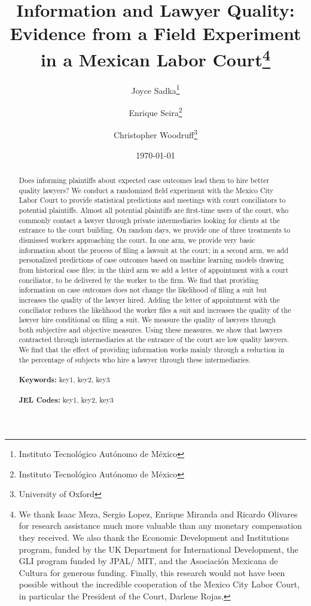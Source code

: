 \documentclass[oneside,12pt]{article}
\begin{document}
\begin{titlepage}
\title{Information and Lawyer Quality: Evidence from a Field Experiment in a Mexican Labor Court\thanks{We thank Isaac Meza, Sergio Lopez, Enrique Miranda and Ricardo Olivares for research assistance much more valuable than any monetary compensation they received. We also thank the Economic Development and Institutions program, funded by the UK Department for International Development, the GLI program funded by JPAL/ MIT, and the Asociación Mexicana de Cultura for generous funding. Finally, this research would not have been possible without the incredible cooperation of the Mexico City Labor Court, in particular the President of the Court, Darlene Rojas.}}
\author{Joyce Sadka\thanks{Instituto Tecnológico Autónomo de México} \and Enrique Seira\thanks{Instituto Tecnológico Autónomo de México} \and Christopher Woodruff\thanks{University of Oxford}}
\date{\today}
\maketitle
\begin{abstract}
\noindent Does informing plaintiffs about expected case outcomes lead them to hire better quality lawyers? We conduct a randomized field experiment with the Mexico City Labor Court to provide statistical predictions and meetings with court conciliators to potential plaintiffs. Almost all potential plaintiffs are first-time users of the court, who commonly contact a lawyer through private intermediaries looking for clients at the entrance to the court building. On random days, we provide one of three treatments to dismissed workers approaching the court. In one arm, we provide very basic information about the process of filing a lawsuit at the court; in a second arm, we add personalized predictions of case outcomes based on machine learning models drawing from historical case files; in the third arm we add a letter of appointment with a court conciliator, to be delivered by the worker to the firm. We find that providing information on case outcomes does not change the likelihood of filing a suit but increases the quality of the lawyer hired. Adding the letter of appointment with the conciliator reduces the likelihood the worker files a suit and increases the quality of the lawyer hire conditional on filing a suit. We measure the quality of lawyers through both subjective and objective measures. Using these measures, we show that lawyers contracted through intermediaries at the entrance of the court are low quality lawyers. We find that the effect of providing information works mainly through a reduction in the percentage of subjects who hire a lawyer through these intermediaries.\\
\vspace{0in}\\
\noindent\textbf{Keywords:} key1, key2, key3\\
\vspace{0in}\\
\noindent\textbf{JEL Codes:} key1, key2, key3\\

\bigskip
\end{abstract}
\setcounter{page}{0}
\thispagestyle{empty}
\end{titlepage}
\end{document}
